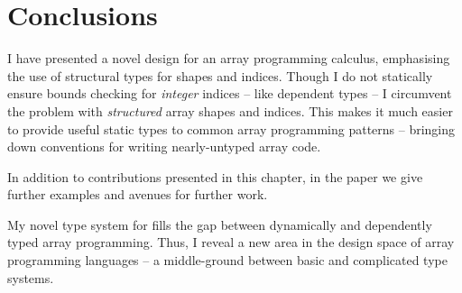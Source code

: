 \section{Conclusions}

I have presented a novel design for an array programming calculus, emphasising the use of structural types for shapes and indices. 
Though I do not statically ensure bounds checking for \emph{integer} indices -- like dependent types -- I circumvent the problem with \emph{structured} array shapes and indices. 
This makes it much easier to provide useful static types to common array programming patterns -- bringing down conventions for writing nearly-untyped array code. 

In addition to contributions presented in this chapter, in the paper \cite{star} we give further examples and avenues for further work.

My novel type system for \starr{} fills the gap between dynamically and dependently typed array programming. Thus, I reveal a new area in the design space of array programming languages -- a middle-ground between basic and complicated type systems.

